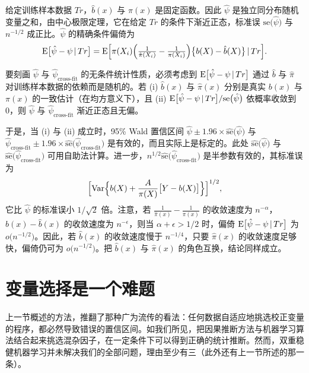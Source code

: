 \begin{techpoint}[拆分样本与交叉拟合估计量的统计性质]
给定训练样本数据 $Tr$，$\hat b(x)$ 与 $\hat\pi(x)$ 是固定函数。因此 $\hat\psi$ 是独立同分布随机变量之和，由中心极限定理，它在给定 $Tr$ 的条件下渐近正态，标准误 $\mathrm{se}\bigl(\hat\psi\bigr)$ 与 $n^{-1/2}$ 成正比。$\hat\psi$ 的精确条件偏倚为
\[
\mathrm{E}\bigl[\hat\psi-\psi\,|\, Tr\bigr]
=\mathrm{E}\Bigl[\pi(X_i)\Bigl(\tfrac{1}{\hat\pi(X_i)}-\tfrac{1}{\pi(X_i)}\Bigr)
\bigl\{b(X)-\hat b(X)\bigr\}\,|\, Tr\Bigr].
\]

要刻画 $\hat\psi$ 与 $\hat\psi_{\text{cross-fit}}$ 的无条件统计性质，必须考虑到 $\mathrm{E}\bigl[\hat\psi-\psi\,|\, Tr\bigr]$ 通过 $\hat b$ 与 $\hat\pi$ 对训练样本数据的依赖而是随机的。若 (i) $\hat b(x)$ 与 $\hat\pi(x)$ 分别是真实 $b(x)$ 与 $\pi(x)$ 的一致估计（在均方意义下），且 (ii) $\mathrm{E}\bigl[\hat\psi-\psi\,|\, Tr\bigr]/\mathrm{se}\bigl(\hat\psi\bigr)$ 依概率收敛到 0，则 $\hat\psi$ 与 $\hat\psi_{\text{cross-fit}}$ 渐近正态且无偏。

于是，当 (i) 与 (ii) 成立时，95\% Wald 置信区间 $\hat\psi\pm 1.96\times\hat{\mathrm{se}}\bigl(\hat\psi\bigr)$ 与 $\hat\psi_{\text{cross-fit}}\pm 1.96\times\hat{\mathrm{se}}\bigl(\hat\psi_{\text{cross-fit}}\bigr)$ 是有效的，而且实际上是标定的。此处 $\hat{\mathrm{se}}\bigl(\hat\psi\bigr)$ 与 $\hat{\mathrm{se}}\bigl(\hat\psi_{\text{cross-fit}}\bigr)$ 可用自助法计算。进一步，$n^{1/2}\hat{\mathrm{se}}\bigl(\hat\psi_{\text{cross-fit}}\bigr)$ 是半参数有效的，其标准误为
\[
\Bigl[\mathrm{Var}\Bigl\{b(X)+\frac{A}{\pi(X)}\bigl[Y-b(X)\bigr]\Bigr\}\Bigr]^{1/2},
\]
它比 $\hat\psi$ 的标准误小 $1/\sqrt{2}$ 倍。注意，若 $\frac{1}{\hat\pi(x)}-\frac{1}{\pi(x)}$ 的收敛速度为 $n^{-\alpha}$，$b(x)-\hat b(x)$ 的收敛速度为 $n^{-\epsilon}$，则当 $\alpha+\epsilon>1/2$ 时，偏倚 $\mathrm{E}\bigl[\hat\psi-\psi\,|\, Tr\bigr]$ 为 $o\bigl(n^{-1/2}\bigr)$。因此，若 $\hat b(x)$ 的收敛速度慢于 $n^{-1/4}$，只要 $\hat\pi(x)$ 的收敛速度足够快，偏倚仍可为 $o\bigl(n^{-1/2}\bigr)$。把 $\hat b(x)$ 与 $\hat\pi(x)$ 的角色互换，结论同样成立。
\end{techpoint}

\section{变量选择是一个难题}

上一节概述的方法，推翻了那种广为流传的看法：任何数据自适应地挑选校正变量的程序，都必然导致错误的置信区间。如我们所见，把因果推断方法与机器学习算法结合起来挑选混杂因子，在一定条件下可以得到正确的统计推断。然而，双重稳健机器学习并未解决我们的全部问题，理由至少有三（此外还有上一节所述的那一条）。

